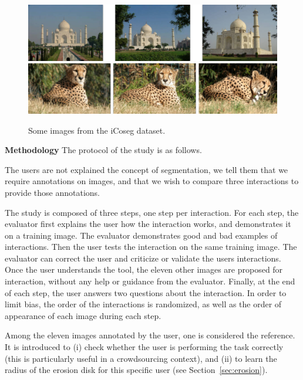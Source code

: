 \begin{figure}[ht]
\centering
\includegraphics[width=\columnwidth]{assets/img/taj_mahal.jpg}
\vfill\vspace{0.5em}\vfill
\includegraphics[width=\columnwidth]{assets/img/cheetah.jpg}
\caption{Some images from the iCoseg dataset.}%
\label{fig:icoseg}
\end{figure}


\textbf{Methodology}
The protocol of the study is as follows.


The users are not explained the concept of segmentation,
we tell them that we require annotations on images,
and that we wish to compare three interactions to provide those annotations.


The study is composed of three steps, one step per interaction.
For each step, the evaluator first explains the user how
the interaction works, and demonstrates it on a training image.
The evaluator demonstrates good and bad examples of interactions.
Then the user tests the interaction on the same training image.
The evaluator can correct the user and criticize or validate
the users interactions.
Once the user understands the tool,
the eleven other images are proposed for interaction,
without any help or guidance from the evaluator.
Finally, at the end of each step,
the user answers two questions about the interaction.
In order to limit bias, the order of the interactions is randomized,
as well as the order of appearance of each image during each step.


Among the eleven images annotated by the user,
one is considered the reference.
It is introduced to (i) check whether the user is performing the task
correctly (this is particularly useful in a crowdsourcing context),
and (ii) to learn the radius of the erosion disk for this specific user
(see Section~\ref{sec:erosion}).


